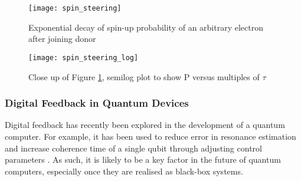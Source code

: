 \begin{figure}[htbp!]
	\centering
	\texttt{[image: spin\_steering]}
	\caption{Exponential decay of spin-up probability of an arbitrary electron after joining donor}
	\label{fig::spin_steering}
\end{figure}


\begin{figure}[htbp!]
	\centering
	\texttt{[image: spin\_steering\_log]}
	\caption{Close up of Figure \ref{fig::spin_steering}, semilog plot to show P versus multiples of $\tau$}
	\label{fig::spin_steering_log}
\end{figure}
\subsubsection{Digital Feedback in Quantum Devices}

Digital feedback has recently been explored in the development of a quantum computer. For example, it has been used to reduce error in resonance estimation \cite{bonato2015optimized} and increase coherence time of a single qubit through adjusting control parameters \cite{shulman2014suppressing}. As such, it is likely to be a key factor in the future of quantum computers, especially once they are realised as black-box systems.
